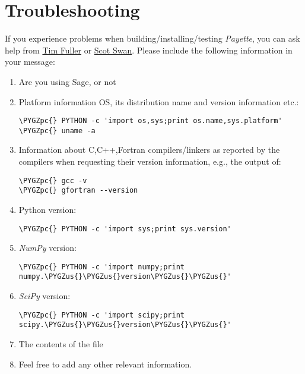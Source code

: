 \documentclass[letterpaper,10pt,english]{sphinxmanual}
\def\PYGZus{\char`\_}
\def\PYGZpc{\char`\%}
\begin{document}
\section{Troubleshooting}
\label{Files/building:troubleshooting}
If you experience problems when building/installing/testing \emph{Payette}, you can
ask help from \href{mailto:tjfulle@sandia.gov}{Tim Fuller} or \href{mailto:mswan@sandia.gov}{Scot Swan}. Please include the following information in your message:
\begin{enumerate}
\item {} 
Are you using Sage, or not

\item {} 
Platform information OS, its distribution name and version information etc.:

\begin{Verbatim}[commandchars=\\\{\}]
\PYGZpc{} PYTHON -c 'import os,sys;print os.name,sys.platform'
\PYGZpc{} uname -a
\end{Verbatim}

\item {} 
Information about C,C++,Fortran compilers/linkers as reported by
the compilers when requesting their version information, e.g.,
the output of:

\begin{Verbatim}[commandchars=\\\{\}]
\PYGZpc{} gcc -v
\PYGZpc{} gfortran --version
\end{Verbatim}

\item {} 
Python version:

\begin{Verbatim}[commandchars=\\\{\}]
\PYGZpc{} PYTHON -c 'import sys;print sys.version'
\end{Verbatim}

\item {} 
\emph{NumPy} version:

\begin{Verbatim}[commandchars=\\\{\}]
\PYGZpc{} PYTHON -c 'import numpy;print numpy.\PYGZus{}\PYGZus{}version\PYGZus{}\PYGZus{}'
\end{Verbatim}

\item {} 
\emph{SciPy} version:

\begin{Verbatim}[commandchars=\\\{\}]
\PYGZpc{} PYTHON -c 'import scipy;print scipy.\PYGZus{}\PYGZus{}version\PYGZus{}\PYGZus{}'
\end{Verbatim}

\item {} 
The contents of the  file

\item {} 
Feel free to add any other relevant information.

\end{enumerate}
\end{document}
